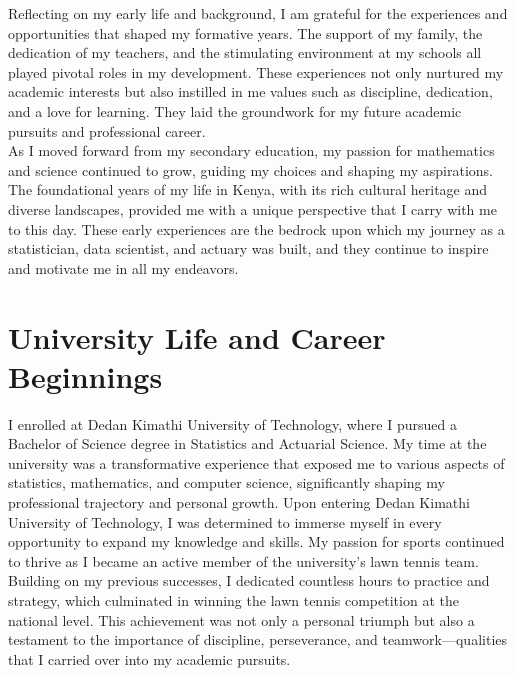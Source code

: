 \documentclass[12pt,a4paper,sans,english]{report}
\begin{document}
	\noindent Reflecting on my early life and background, I am grateful for the experiences and opportunities that shaped my formative years. The support of my family, the dedication of my teachers, and the stimulating environment at my schools all played pivotal roles in my development. These experiences not only nurtured my academic interests but also instilled in me values such as discipline, dedication, and a love for learning. They laid the groundwork for my future academic pursuits and professional career.\\
	
\noindent	As I moved forward from my secondary education, my passion for mathematics and science continued to grow, guiding my choices and shaping my aspirations. The foundational years of my life in Kenya, with its rich cultural heritage and diverse landscapes, provided me with a unique perspective that I carry with me to this day. These early experiences are the bedrock upon which my journey as a statistician, data scientist, and actuary was built, and they continue to inspire and motivate me in all my endeavors.
	
	\chapter{University Life and Career Beginnings}
	
I enrolled at Dedan Kimathi University of Technology, where I pursued a Bachelor of Science degree in Statistics and Actuarial Science. My time at the university was a transformative experience that exposed me to various aspects of statistics, mathematics, and computer science, significantly shaping my professional trajectory and personal growth. Upon entering Dedan Kimathi University of Technology, I was determined to immerse myself in every opportunity to expand my knowledge and skills. My passion for sports continued to thrive as I became an active member of the university’s lawn tennis team. Building on my previous successes, I dedicated countless hours to practice and strategy, which culminated in winning the lawn tennis competition at the national level. This achievement was not only a personal triumph but also a testament to the importance of discipline, perseverance, and teamwork—qualities that I carried over into my academic pursuits.\\
\end{document}
